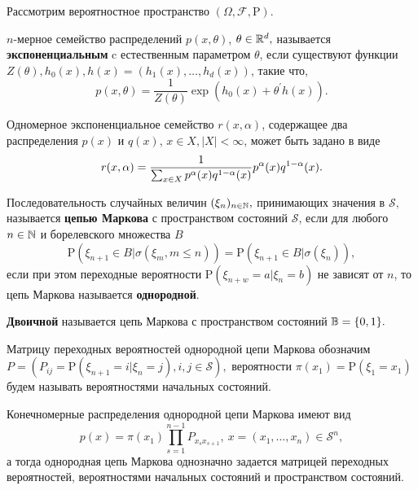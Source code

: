 Рассмотрим вероятностное пространство $(\Omega, \mathcal{F}, \mathrm{P}).$

\begin{opr}
$n\!$-мерное семейство распределений $p(x,\theta) \!$, $\theta \in \R^{d},$ называется \textbf{экспоненциальным} c естественным параметром $\theta \!$, если существуют функции $Z(\theta), h_0 (x), h(x) = (h_1 (x), \ldots, h_d(x)) \!$, такие что, 
$$p(x,\theta) = \frac{1}{Z(\theta)}\exp \left(  h_0(x) + \theta^\prime h(x) \right). $$  
\end{opr}

Одномерное экспоненциальное семейство $r(x, \alpha) \!$, содержащее два распределения $p(x)$ и $q(x)\!$, $x \in X, |X| < \infty \!$, может быть задано в виде
\begin{equation} \label{1_DIM_EXP_FAM}
r(x, \alpha) = \frac{1}{\sum_{x \in X} p^\al (x) q^\ea (x)} p^\al (x) q^\ea (x).
\end{equation}

\begin{opr}
Последовательность случайных величин $(\xi_n)_{n \in \N},$ принимающих значения в $\mathcal{S},$ называется \textbf{цепью Маркова} с пространством состояний $\mathcal{S}$, если для любого $n \in \N$ и борелевского множества $B$ 
$$\mathrm{P} (\xi_{n + 1} \in B | \sigma(\xi_m, m \leq n)) = \mathrm{P} (\xi_{n + 1} \in B | \sigma(\xi_n)),$$
если при этом переходные вероятности $\mathrm{P}(\xi_{n+w} = a | \xi_{n} = b)$ не зависят от $n \!$, то цепь Маркова называется \textbf{однородной}.  
\end{opr}

\begin{opr}
\textbf{Двоичной} называется цепь Маркова с пространством состояний $\mathbb{B} = \{0, 1\}.$
\end{opr}

Матрицу переходных вероятностей однородной цепи Маркова обозначим $P = (P_{ij} = \mathrm{P}(\xi_{n+1} = i | \xi_{n} = j), i, j \in \mathcal{S}),$ вероятности $\pi(x_1) = \mathrm{P}(\xi_1 = x_1)$ будем называть вероятностями начальных состояний.

\begin{ass}
Конечномерные распределения однородной цепи Маркова имеют вид 
\begin{equation} \label{FINITE_DIST}
p(x) = \pi (x_1) \prod_{s=1}^{n-1} P_{x_s x_{s+1}}, \ x = (x_1, \ldots, x_n) \in \mathcal{S}^n,
\end{equation}
а тогда однородная цепь Маркова однозначно задается матрицей переходных вероятностей, вероятностями начальных состояний и пространством состояний.
\end{ass}

